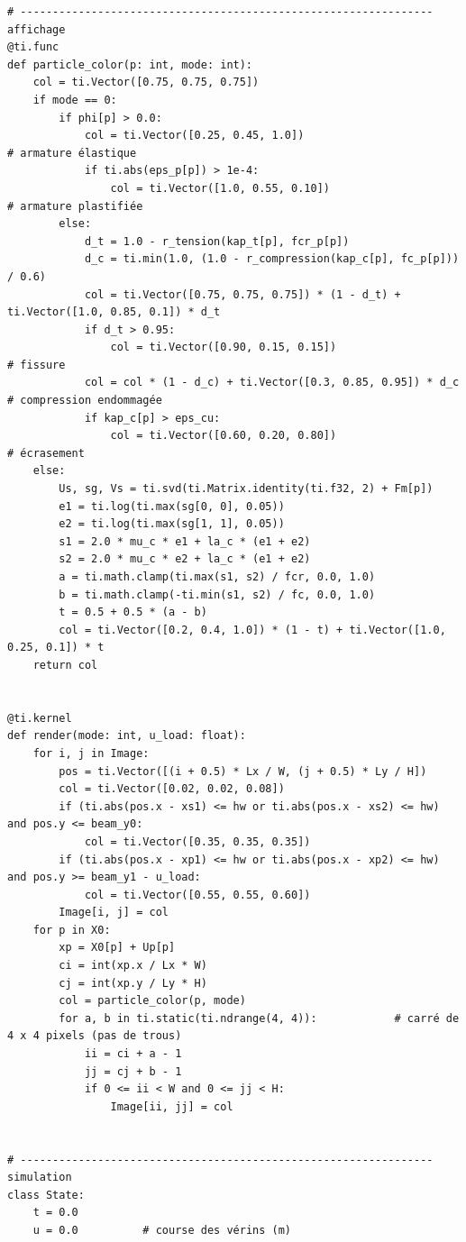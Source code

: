 \documentclass[11pt,a4paper]{article}
\begin{document}
\begin{lstlisting}
# ---------------------------------------------------------------- affichage
@ti.func
def particle_color(p: int, mode: int):
    col = ti.Vector([0.75, 0.75, 0.75])
    if mode == 0:
        if phi[p] > 0.0:
            col = ti.Vector([0.25, 0.45, 1.0])                           # armature élastique
            if ti.abs(eps_p[p]) > 1e-4:
                col = ti.Vector([1.0, 0.55, 0.10])                       # armature plastifiée
        else:
            d_t = 1.0 - r_tension(kap_t[p], fcr_p[p])
            d_c = ti.min(1.0, (1.0 - r_compression(kap_c[p], fc_p[p])) / 0.6)
            col = ti.Vector([0.75, 0.75, 0.75]) * (1 - d_t) + ti.Vector([1.0, 0.85, 0.1]) * d_t
            if d_t > 0.95:
                col = ti.Vector([0.90, 0.15, 0.15])                      # fissure
            col = col * (1 - d_c) + ti.Vector([0.3, 0.85, 0.95]) * d_c   # compression endommagée
            if kap_c[p] > eps_cu:
                col = ti.Vector([0.60, 0.20, 0.80])                      # écrasement
    else:
        Us, sg, Vs = ti.svd(ti.Matrix.identity(ti.f32, 2) + Fm[p])
        e1 = ti.log(ti.max(sg[0, 0], 0.05))
        e2 = ti.log(ti.max(sg[1, 1], 0.05))
        s1 = 2.0 * mu_c * e1 + la_c * (e1 + e2)
        s2 = 2.0 * mu_c * e2 + la_c * (e1 + e2)
        a = ti.math.clamp(ti.max(s1, s2) / fcr, 0.0, 1.0)
        b = ti.math.clamp(-ti.min(s1, s2) / fc, 0.0, 1.0)
        t = 0.5 + 0.5 * (a - b)
        col = ti.Vector([0.2, 0.4, 1.0]) * (1 - t) + ti.Vector([1.0, 0.25, 0.1]) * t
    return col


@ti.kernel
def render(mode: int, u_load: float):
    for i, j in Image:
        pos = ti.Vector([(i + 0.5) * Lx / W, (j + 0.5) * Ly / H])
        col = ti.Vector([0.02, 0.02, 0.08])
        if (ti.abs(pos.x - xs1) <= hw or ti.abs(pos.x - xs2) <= hw) and pos.y <= beam_y0:
            col = ti.Vector([0.35, 0.35, 0.35])
        if (ti.abs(pos.x - xp1) <= hw or ti.abs(pos.x - xp2) <= hw) and pos.y >= beam_y1 - u_load:
            col = ti.Vector([0.55, 0.55, 0.60])
        Image[i, j] = col
    for p in X0:
        xp = X0[p] + Up[p]
        ci = int(xp.x / Lx * W)
        cj = int(xp.y / Ly * H)
        col = particle_color(p, mode)
        for a, b in ti.static(ti.ndrange(4, 4)):            # carré de 4 x 4 pixels (pas de trous)
            ii = ci + a - 1
            jj = cj + b - 1
            if 0 <= ii < W and 0 <= jj < H:
                Image[ii, jj] = col


# ---------------------------------------------------------------- simulation
class State:
    t = 0.0
    u = 0.0          # course des vérins (m)



\end{lstlisting}
\end{document}
